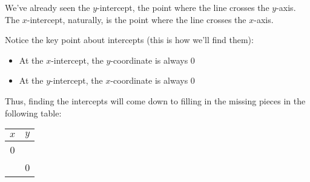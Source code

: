 We've already seen the $y$-intercept, the point where the line crosses the $y$-axis.  The $x$-intercept, naturally, is the point where the line crosses the $x$-axis.
\begin{center}
\end{center}
\pagebreak

Notice the key point about intercepts (this is how we'll find them): 
\begin{itemize}
\item At the $x$-intercept, the $y$-coordinate is always 0
\item At the $y$-intercept, the $x$-coordinate is always 0
\end{itemize}

Thus, finding the intercepts will come down to filling in the missing pieces in the following table:
\begin{center}
{\Large
\begin{tabular}{c | c}
$x$ & $y$\\
\hline
0 & \\
 & 0\\
\end{tabular}}
\end{center}

